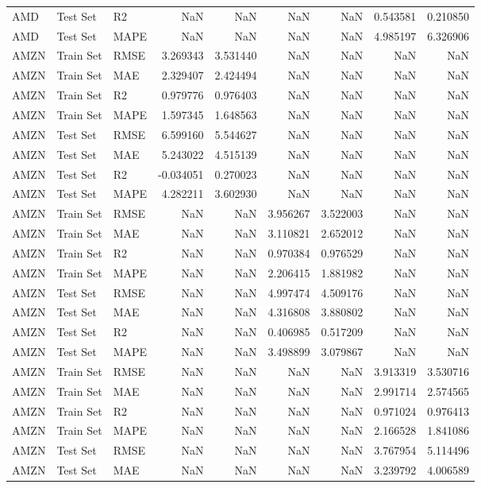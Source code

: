 \begin{tabular}{lllrrrrrr}
AMD & Test Set & R2 & NaN & NaN & NaN & NaN & 0.543581 & 0.210850 \\
AMD & Test Set & MAPE & NaN & NaN & NaN & NaN & 4.985197 & 6.326906 \\
AMZN & Train Set & RMSE & 3.269343 & 3.531440 & NaN & NaN & NaN & NaN \\
AMZN & Train Set & MAE & 2.329407 & 2.424494 & NaN & NaN & NaN & NaN \\
AMZN & Train Set & R2 & 0.979776 & 0.976403 & NaN & NaN & NaN & NaN \\
AMZN & Train Set & MAPE & 1.597345 & 1.648563 & NaN & NaN & NaN & NaN \\
AMZN & Test Set & RMSE & 6.599160 & 5.544627 & NaN & NaN & NaN & NaN \\
AMZN & Test Set & MAE & 5.243022 & 4.515139 & NaN & NaN & NaN & NaN \\
AMZN & Test Set & R2 & -0.034051 & 0.270023 & NaN & NaN & NaN & NaN \\
AMZN & Test Set & MAPE & 4.282211 & 3.602930 & NaN & NaN & NaN & NaN \\
AMZN & Train Set & RMSE & NaN & NaN & 3.956267 & 3.522003 & NaN & NaN \\
AMZN & Train Set & MAE & NaN & NaN & 3.110821 & 2.652012 & NaN & NaN \\
AMZN & Train Set & R2 & NaN & NaN & 0.970384 & 0.976529 & NaN & NaN \\
AMZN & Train Set & MAPE & NaN & NaN & 2.206415 & 1.881982 & NaN & NaN \\
AMZN & Test Set & RMSE & NaN & NaN & 4.997474 & 4.509176 & NaN & NaN \\
AMZN & Test Set & MAE & NaN & NaN & 4.316808 & 3.880802 & NaN & NaN \\
AMZN & Test Set & R2 & NaN & NaN & 0.406985 & 0.517209 & NaN & NaN \\
AMZN & Test Set & MAPE & NaN & NaN & 3.498899 & 3.079867 & NaN & NaN \\
AMZN & Train Set & RMSE & NaN & NaN & NaN & NaN & 3.913319 & 3.530716 \\
AMZN & Train Set & MAE & NaN & NaN & NaN & NaN & 2.991714 & 2.574565 \\
AMZN & Train Set & R2 & NaN & NaN & NaN & NaN & 0.971024 & 0.976413 \\
AMZN & Train Set & MAPE & NaN & NaN & NaN & NaN & 2.166528 & 1.841086 \\
AMZN & Test Set & RMSE & NaN & NaN & NaN & NaN & 3.767954 & 5.114496 \\
AMZN & Test Set & MAE & NaN & NaN & NaN & NaN & 3.239792 & 4.006589 \\

\end{tabular}
